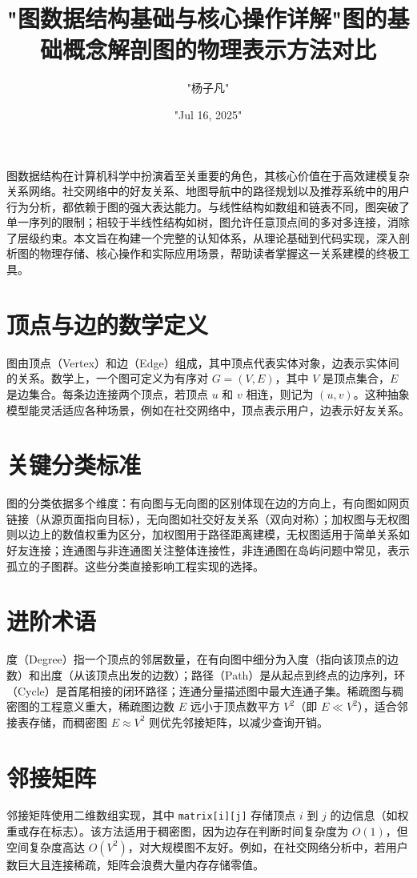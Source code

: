 \title{"图数据结构基础与核心操作详解"}
\author{"杨子凡"}
\date{"Jul 16, 2025"}
\maketitle
图数据结构在计算机科学中扮演着至关重要的角色，其核心价值在于高效建模复杂关系网络。社交网络中的好友关系、地图导航中的路径规划以及推荐系统中的用户行为分析，都依赖于图的强大表达能力。与线性结构如数组和链表不同，图突破了单一序列的限制；相较于半线性结构如树，图允许任意顶点间的多对多连接，消除了层级约束。本文旨在构建一个完整的认知体系，从理论基础到代码实现，深入剖析图的物理存储、核心操作和实际应用场景，帮助读者掌握这一关系建模的终极工具。\par
\title{图的基础概念解剖}
\chapter{顶点与边的数学定义}
图由顶点（Vertex）和边（Edge）组成，其中顶点代表实体对象，边表示实体间的关系。数学上，一个图可定义为有序对 $G = (V, E)$，其中 $V$ 是顶点集合，$E$ 是边集合。每条边连接两个顶点，若顶点 $u$ 和 $v$ 相连，则记为 $(u, v)$。这种抽象模型能灵活适应各种场景，例如在社交网络中，顶点表示用户，边表示好友关系。\par
\chapter{关键分类标准}
图的分类依据多个维度：有向图与无向图的区别体现在边的方向上，有向图如网页链接（从源页面指向目标），无向图如社交好友关系（双向对称）；加权图与无权图则以边上的数值权重为区分，加权图用于路径距离建模，无权图适用于简单关系如好友连接；连通图与非连通图关注整体连接性，非连通图在岛屿问题中常见，表示孤立的子图群。这些分类直接影响工程实现的选择。\par
\chapter{进阶术语}
度（Degree）指一个顶点的邻居数量，在有向图中细分为入度（指向该顶点的边数）和出度（从该顶点出发的边数）；路径（Path）是从起点到终点的边序列，环（Cycle）是首尾相接的闭环路径；连通分量描述图中最大连通子集。稀疏图与稠密图的工程意义重大，稀疏图边数 $E$ 远小于顶点数平方 $V^2$（即 $E \ll V^2$），适合邻接表存储，而稠密图 $E \approx V^2$ 则优先邻接矩阵，以减少查询开销。\par
\title{图的物理表示方法对比}
\chapter{邻接矩阵}
邻接矩阵使用二维数组实现，其中 \texttt{matrix[i][j]} 存储顶点 $i$ 到 $j$ 的边信息（如权重或存在标志）。该方法适用于稠密图，因为边存在判断时间复杂度为 $O(1)$，但空间复杂度高达 $O(V^2)$，对大规模图不友好。例如，在社交网络分析中，若用户数巨大且连接稀疏，矩阵会浪费大量内存存储零值。\par
